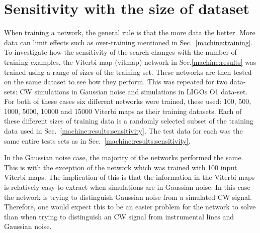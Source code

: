 \section{\label{machine:cnn:sens_size} Sensitivity with the size of dataset}

When training a network, the general rule is that the more data the better. 
More data can limit effects such as over-training mentioned in Sec.~\ref{machine:training}.
To investigate how the sensitivity of the search changes with the number of training examples, the Viterbi map (vitmap) network in Sec.\ref{machine:results} was trained using a range of sizes of the training set. 
These networks are then tested on the same dataset to see how they perform.
This was repeated for two data-sets: \ac{CW} simulations in Gaussian noise and simulations in \acp{LIGO} O1 data-set. 
For both of these cases six different networks were trained, these used: 100, 500, 1000, 5000, 10000 and 15000 Viterbi maps as their training datasets.
Each of these different sizes of training data is a randomly selected subset of the training data used in Sec.~\ref{machine:results:sensitivity}.
The test data for each was the same entire tests sets as in Sec.~\ref{machine:results:sensitivity}.

In the Gaussian noise case, the majority of the networks performed the same. 
This is with the exception of the network which was trained with 100 input Viterbi maps. 
The implication of this is that the information in the Viterbi maps is relatively easy to extract when simulations are in Gaussian noise. 
In this case the network is trying to distinguish Gaussian noise from a simulated \ac{CW} signal.
Therefore, one would expect this to be an easier problem for the network to solve than when trying to distinguish an \ac{CW} signal from instrumental lines and Gaussian noise. 

